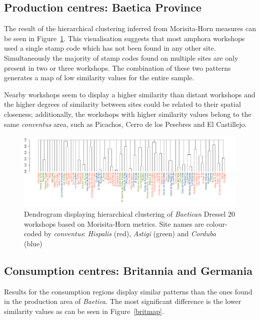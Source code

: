 \subsection{Production centres: Baetica Province}
\label{sec:6}

The result of the hierarchical clustering inferred from Morisita-Horn measures can be seen in Figure~\ref{dendro}. This visualisation suggests that most amphora workshops used a single stamp code which has not been found in any other site. Simultaneously the majority of stamp codes found on multiple sites are only present in two or three workshops. The combination of these two patterns generates a map of low similarity values for the entire sample.

Nearby workshops seem to display a higher similarity than distant workshops and the higher degrees of similarity between sites could be related to their spatial closeness; additionally, the workshops with higher similarity values belong to the same \textit{conventus} area, such as Picachos, Cerro de los Pesebres and El Castillejo.

\begin{figure}[htp]
	\centering
\includegraphics[angle=270, width=0.7\linewidth]{dendro}
\caption{Dendrogram displaying hierarchical clustering of \textit{Baetican} Dressel 20 workshops based on Morisita-Horn metrics. Site names are colour-coded by \textit{conventus}: \textit{Hispalis} (red), \textit{Astigi} (green) and \textit{Corduba} (blue)}
\label{dendro}

\end{figure}

\subsection{Consumption centres: Britannia and Germania}
\label{sec:6}

Results for the consumption regions display similar patterns than the ones found in the production area of \textit{Baetica}. The most significant difference is the lower similarity values as can be seen in Figure~\ref{britmap}.


